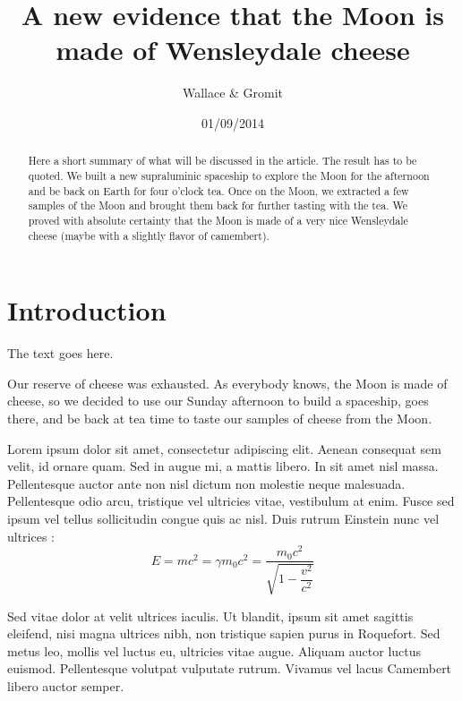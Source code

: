 \documentclass[final,12pt]{article}
\begin{document}
%
\title{{\color{red}A new evidence that the Moon is made of Wensleydale cheese}}
\author{{\color{red}Wallace \& Gromit}}
%
\date{{\color{red}01/09/2014}}

\maketitle
%
\begin{abstract}
Here a short summary of what will be discussed in the article. The
result has to be quoted. We built a new supraluminic spaceship to
explore the Moon for the afternoon and be back on Earth for four
o'clock tea. Once on the Moon, we extracted a few samples of the Moon
and brought them back for further tasting with the tea.  We proved
with absolute certainty that the Moon is made of a very nice
Wensleydale cheese (maybe with a slightly flavor of camembert).
\end{abstract}

\section{Introduction}
\label{intro}
The text goes here. 

Our reserve of cheese was exhausted. As everybody knows, the Moon is
made of cheese, so we decided to use our Sunday afternoon to build a
spaceship, goes there, and be back at tea time to taste our samples of
cheese from the Moon.

Lorem ipsum dolor sit amet, consectetur adipiscing elit. Aenean
consequat sem velit, id ornare quam. Sed in augue mi, a mattis
libero. In sit amet nisl massa. Pellentesque auctor ante non nisl
dictum non molestie neque malesuada. Pellentesque odio arcu, tristique
vel ultricies vitae, vestibulum at enim. Fusce sed ipsum vel tellus
sollicitudin congue quis ac nisl. Duis rutrum Einstein nunc vel
ultrices :
\begin{equation}
E = m c^2 = \gamma m_0 c^2 = \dfrac{m_0 c^2}{\sqrt{1 - \dfrac{v^2}{c^2}}} 
\end{equation}

Sed vitae dolor at velit ultrices iaculis. Ut blandit, ipsum sit amet
sagittis eleifend, nisi magna ultrices nibh, non tristique sapien
purus in Roquefort. Sed metus leo, mollis vel luctus eu, ultricies vitae
augue. Aliquam auctor luctus euismod. Pellentesque volutpat vulputate
rutrum. Vivamus vel lacus Camembert libero auctor semper.
\end{document}
